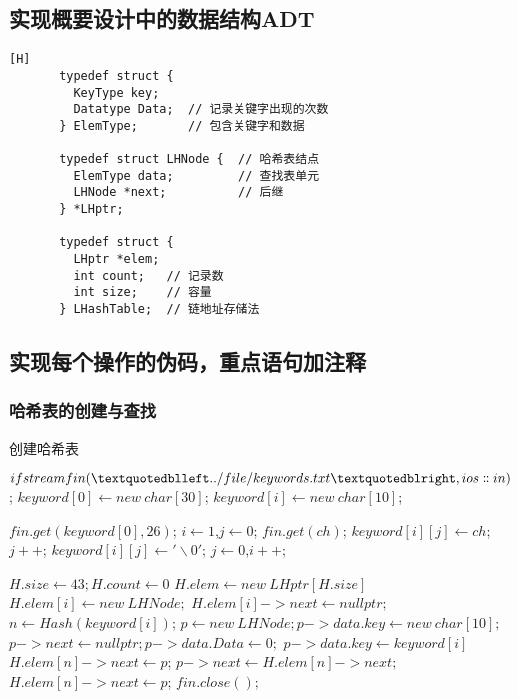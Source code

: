 \subsection{实现概要设计中的数据结构ADT}\label{subsec:adt2}
\begin{lstlisting}[caption={},label={lst:lstlisting}][H]
       typedef struct {
         KeyType key;
         Datatype Data;  // 记录关键字出现的次数
       } ElemType;       // 包含关键字和数据

       typedef struct LHNode {  // 哈希表结点
         ElemType data;         // 查找表单元
         LHNode *next;          // 后继
       } *LHptr;

       typedef struct {
         LHptr *elem;
         int count;   // 记录数
         int size;    // 容量
       } LHashTable;  // 链地址存储法
\end{lstlisting}

\subsection{实现每个操作的伪码，重点语句加注释}\label{subsec:explain}

\subsubsection{哈希表的创建与查找}
\begin{algorithm}[H]
	\caption{创建哈希表}
	\begin{algorithmic}[1] %
			\State $ifstream fin(“../file/keywords.txt”, ios \dblcolon in)$;
			\State $keyword[0] \gets new\ char[30]$;
				\State $keyword[i] \gets new\ char[10]$;
			\EndFor

			\State $fin.get(keyword[0], 26)$;
			\State $i\gets 1$,$j\gets 0$;
				\State $fin.get(ch)$;
					\State $keyword[i][j] \gets  ch$;
					\State $j++$;
				\Else
					\State $keyword[i][j] \gets '\backslash 0'$;
					\State $j \gets  0$,$i++$;
				\EndIf
			\EndWhile

			\State $H.size \gets  43;H.count \gets  0$
			\State $H.elem \gets  new\ LHptr[H.size]$
				\State $H.elem[i] \gets  new\ LHNode;$ 
				\State $H.elem[i]->next \gets  nullptr;$
			\EndFor
				\State $n \gets  Hash(keyword[i])$;
				\State $p \gets  new\ LHNode;p->data.key \gets  new\ char[10];$
				\State $p->next \gets  nullptr;p->data.Data \gets  0;$
				\State $p->data.key \gets keyword[i]$
					\State $H.elem[n]->next \gets  p$;
				\Else
					\State $p->next \gets  H.elem[n]->next$;
					\State $H.elem[n]->next \gets  p$;
				\EndIf
			\EndFor
			\State $fin.close();$
		\EndFunction
	\end{algorithmic}\label{alg:algorithm}
\end{algorithm}

